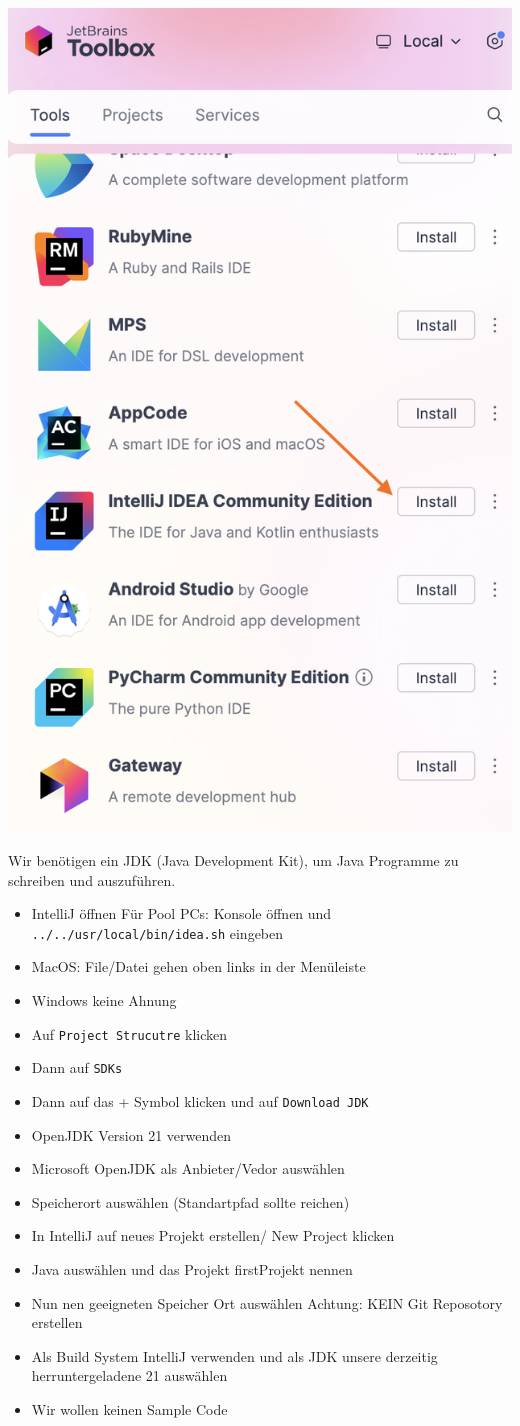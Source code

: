 \documentclass{../../sheet}
\begin{document}
\includegraphics[width=0.5\linewidth]{../img/IntelliJDownload.png}

\newpage

Wir benötigen ein JDK (Java Development Kit), um Java Programme zu schreiben und
auszuführen.
\begin{itemize}
  \item IntelliJ öffnen \newline \achtung{} Für Pool PCs: Konsole öffnen und \texttt{../../usr/local/bin/idea.sh} eingeben
  \item MacOS: File/Datei gehen oben links in der Menüleiste
  \item Windows keine Ahnung
  \item Auf \texttt{Project Strucutre} klicken
  \item Dann auf \texttt{SDKs}
  \item Dann auf das + Symbol klicken und auf \texttt{Download JDK}
  \item OpenJDK Version 21 verwenden
  \item Microsoft OpenJDK als Anbieter/Vedor auswählen
  \item Speicherort auswählen (Standartpfad sollte reichen)
\end{itemize}

\newpage

\begin{itemize}
  \item In IntelliJ auf neues Projekt erstellen/ New Project klicken
  \item Java auswählen und das Projekt firstProjekt nennen
  \item Nun nen geeigneten Speicher Ort auswählen Achtung: KEIN Git Reposotory erstellen
  \item Als Build System IntelliJ verwenden und als JDK unsere derzeitig herruntergeladene 21 auswählen
  \item Wir wollen keinen Sample Code
\end{itemize}
\end{document}
